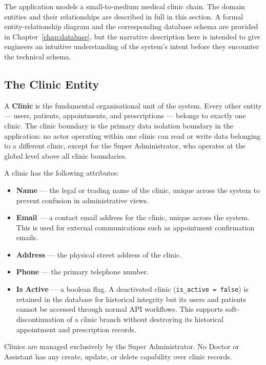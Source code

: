 The application models a small-to-medium medical clinic chain. The
domain entities and their relationships are described in full in this
section. A formal entity-relationship diagram and the corresponding
database schema are provided in Chapter~\ref{chap:database}, but the
narrative description here is intended to give engineers an intuitive
understanding of the system's intent before they encounter the
technical schema.

\subsection{The Clinic Entity}
\label{sec:domain-clinic}

A \textbf{Clinic} is the fundamental organisational unit of the system.
Every other entity --- users, patients, appointments, and prescriptions
--- belongs to exactly one clinic. The clinic boundary is the primary
data isolation boundary in the application: no actor operating within
one clinic can read or write data belonging to a different clinic,
except for the Super Administrator, who operates at the global level
above all clinic boundaries.

A clinic has the following attributes:

\begin{itemize}
  \item \textbf{Name} --- the legal or trading name of the clinic,
    unique across the system to prevent confusion in administrative views.
  \item \textbf{Email} --- a contact email address for the clinic,
    unique across the system. This is used for external communications
    such as appointment confirmation emails.
  \item \textbf{Address} --- the physical street address of the clinic.
  \item \textbf{Phone} --- the primary telephone number.
  \item \textbf{Is Active} --- a boolean flag. A deactivated clinic
    (\texttt{is\_active = false}) is retained in the database for
    historical integrity but its users and patients cannot be accessed
    through normal API workflows. This supports soft-discontinuation of
    a clinic branch without destroying its historical appointment and
    prescription records.
\end{itemize}

Clinics are managed exclusively by the Super Administrator. No Doctor or
Assistant has any create, update, or delete capability over clinic records.

